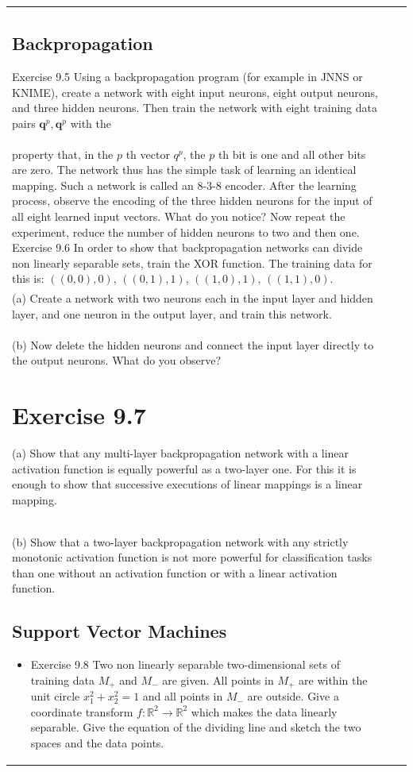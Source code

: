 \documentclass[10pt]{book}
\begin{document}
\begin{center}
\begin{tabular}{|l|l|l|}
\subsection{Backpropagation}
Exercise 9.5 Using a backpropagation program (for example in JNNS or KNIME), create a network with eight input neurons, eight output neurons, and three hidden neurons. Then train the network with eight training data pairs $\boldsymbol{q}^{p}, \boldsymbol{q}^{p}$ with the\\
property that, in the $p$ th vector $q^{p}$, the $p$ th bit is one and all other bits are zero. The network thus has the simple task of learning an identical mapping. Such a network is called an 8-3-8 encoder. After the learning process, observe the encoding of the three hidden neurons for the input of all eight learned input vectors. What do you notice? Now repeat the experiment, reduce the number of hidden neurons to two and then one.
Exercise 9.6 In order to show that backpropagation networks can divide non linearly separable sets, train the XOR function. The training data for this is: $((0,0), 0)$, $((0,1), 1)$, $((1,0), 1)$, $((1,1), 0)$.\\
(a) Create a network with two neurons each in the input layer and hidden layer, and one neuron in the output layer, and train this network.\\
(b) Now delete the hidden neurons and connect the input layer directly to the output neurons. What do you observe?

\section{Exercise 9.7}
(a) Show that any multi-layer backpropagation network with a linear activation function is equally powerful as a two-layer one. For this it is enough to show that successive executions of linear mappings is a linear mapping.\\
(b) Show that a two-layer backpropagation network with any strictly monotonic activation function is not more powerful for classification tasks than one without an activation function or with a linear activation function.

\subsection{Support Vector Machines}
\begin{itemize}
  \item Exercise 9.8 Two non linearly separable two-dimensional sets of training data $M_{+}$ and $M_{-}$ are given. All points in $M_{+}$ are within the unit circle $x_{1}^{2}+x_{2}^{2}=1$ and all points in $M_{-}$ are outside. Give a coordinate transform $f: \mathbb{R}^{2} \rightarrow \mathbb{R}^{2}$ which makes the data linearly separable. Give the equation of the dividing line and sketch the two spaces and the data points.
\end{itemize}


\end{tabular}
\end{center}
\end{document}
